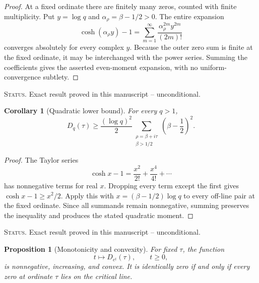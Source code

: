 \documentclass[11pt]{amsart}
\numberwithin{equation}{section}
\theoremstyle{plain}
\newtheorem{proposition}[theorem]{Proposition}
\newtheorem{corollary}[theorem]{Corollary}
\theoremstyle{definition}
\theoremstyle{remark}
\newcommand{\1}{\mathbf{1}}
\newcommand{\statusnote}[1]{%
  \par\smallskip\noindent
  \begingroup\footnotesize\textsc{Status.} #1\endgroup
  \par\smallskip}
\begin{document}
\begin{proof}
At a fixed ordinate there are finitely many zeros, counted with finite
multiplicity.  Put \(y=\log q\) and
\(\alpha_\rho=\beta-1/2>0\).  The entire expansion
\begin{equation}
\cosh(\alpha_\rho y)-1
=
\sum_{m=1}^{\infty}
\frac{\alpha_\rho^{2m}y^{2m}}{(2m)!}
\label{eq:Dq_cosh_series_proof}
\end{equation}
converges absolutely for every complex \(y\).  Because the outer zero sum
is finite at the fixed ordinate, it may be interchanged with the power
series.  Summing the coefficients gives the asserted even-moment
expansion, with no uniform-convergence subtlety.
\end{proof}

\statusnote{Exact result proved in this manuscript -- unconditional.}
\begin{corollary}[Quadratic lower bound]
\label{cor:Dq_quadratic_lower}
For every $q>1$,
\begin{equation}
D_q(\tau)
\geq
\frac{(\log q)^2}{2}
\sum_{\substack{\rho=\beta+i\tau\\\beta>1/2}}
\left(\beta-\frac12\right)^2.
\label{eq:Dq_quadratic_lower}
\end{equation}
\end{corollary}

\begin{proof}
The Taylor series
\begin{equation}
\cosh x-1
=
\frac{x^2}{2!}+\frac{x^4}{4!}+\cdots
\label{eq:cosh_nonnegative_series}
\end{equation}
has nonnegative terms for real \(x\).  Dropping every term except the first
gives \(\cosh x-1\geq x^2/2\).  Apply this with
\(x=(\beta-1/2)\log q\) to every off-line pair at the fixed ordinate.
Since all summands remain nonnegative, summing preserves the inequality and
produces the stated quadratic moment.
\end{proof}

\statusnote{Exact result proved in this manuscript -- unconditional.}
\begin{proposition}[Monotonicity and convexity]
\label{prop:Dq_monotonicity}
For fixed $\tau$, the function
\begin{equation}
t\longmapsto D_{e^t}(\tau),
\qquad t\geq0,
\label{eq:D_exp_t}
\end{equation}
is nonnegative, increasing, and convex.  It is identically zero if and only
if every zero at ordinate $\tau$ lies on the critical line.
\end{proposition}
\end{document}
